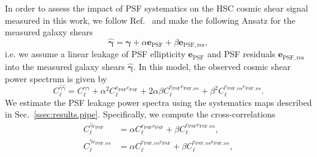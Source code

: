 \documentclass[a4paper,11pt]{article}
\newcommand{\ellip}{\boldsymbol{e}}
\begin{document}
      In order to assess the impact of PSF systematics on the HSC cosmic shear signal measured in this work, we follow Ref.~\cite{1809.09148} and make the following Ansatz for the measured galaxy shears
      \begin{equation}
        \hat{\boldsymbol{\gamma}} = \boldsymbol{\gamma} + \alpha \ellip_{\mathrm{PSF}} + \beta \ellip_{\mathrm{PSF}, \mathrm{res}},
      \end{equation}
      i.e. we assume a linear leakage of PSF ellipticity $\ellip_{\mathrm{PSF}}$ and PSF residuals $\ellip_{\mathrm{PSF},\mathrm{res}}$ into the measured galaxy shears $\hat{\boldsymbol{\gamma}}$. In this model, the observed cosmic shear power spectrum is given by
      \begin{equation}
        C_{\ell}^{\hat{\gamma}\hat{\gamma}} = C_{\ell}^{\gamma\gamma} + \alpha^2 C_{\ell}^{e_{\mathrm{PSF}}e_{\mathrm{PSF}}} + 2 \alpha \beta C_{\ell}^{e_{\mathrm{PSF}}e_{\mathrm{PSF}, \mathrm{res}}} + \beta^2 C_{\ell}^{e_{\mathrm{PSF}, \mathrm{res}}e_{\mathrm{PSF}, \mathrm{res}}}.
      \end{equation}
      We estimate the PSF leakage power spectra using the systematics maps described in Sec.~\ref{ssec:results.pipe}. Specifically, we compute the cross-correlations
      \begin{align}
        C_{\ell}^{\hat{\gamma}e_{\mathrm{PSF}}} &= \alpha C_{\ell}^{e_{\mathrm{PSF}}e_{\mathrm{PSF}}} + \beta C_{\ell}^{e_{\mathrm{PSF}}e_{\mathrm{PSF}, \mathrm{res}}}, \\
        C_{\ell}^{\hat{\gamma}e_{\mathrm{PSF}, \mathrm{res}}} &= \alpha C_{\ell}^{e_{\mathrm{PSF}, \mathrm{res}}e_{\mathrm{PSF}}} + \beta C_{\ell}^{e_{\mathrm{PSF}, \mathrm{res}}e_{\mathrm{PSF}, \mathrm{res}}},
      \end{align}
\end{document}

